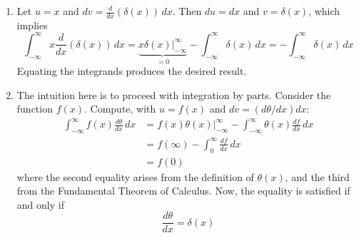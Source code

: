 \documentclass[a4paper]{article}
\begin{document}
\newpage

\begin{enumerate}[label=(\alph*)]
	\item Let \( u = x \) and \( dv = \frac{d }{d x}\!\left( \delta \!\left( x \right) \right) \, dx \). Then \( du = dx \) and \( v = \delta \!\left( x \right) \), which implies
	\[
		\int^{\infty}_{-\infty} x \frac{d }{d x}\!\left( \delta \!\left( x \right) \right) \, dx = \underbrace{x \delta \!\left( x \right) \Big|^{\infty}_{-\infty}}_{= 0} - \int^{\infty}_{-\infty} \delta \!\left( x \right) \, dx = -\int^{\infty}_{-\infty} \delta \!\left( x \right) \, dx
	\]
	Equating the integrands produces the desired result.
	\item The intuition here is to proceed with integration by parts. Consider the function \( f \!\left( x \right) \). Compute, with \( u = f \!\left( x \right) \) and \( dv = \!\left( d \theta / dx \right)dx \):
	\begin{align*}
		\int^{\infty}_{-\infty} f \!\left( x \right)\frac{d \theta}{d x} \, dx & = f \!\left( x \right)\theta \!\left( x \right) \Big|^{\infty}_{-\infty} - \int^{\infty}_{-\infty} \theta \!\left( x \right) \frac{d f}{d x} \, dx \\
		 & = f \!\left( \infty \right) - \int^{\infty}_{0} \frac{d f}{d x} \, dx \\
		 & = f \!\left( 0 \right)
	\end{align*}
	where the second equality arises from the definition of \( \theta \!\left( x \right) \), and the third from the Fundamental Theorem of Calculus. Now, the equality is satisfied if and only if 
	\[
		\frac{d \theta}{d x} = \delta \!\left( x \right)
	\]
\end{enumerate}

\newpage
\end{document}

